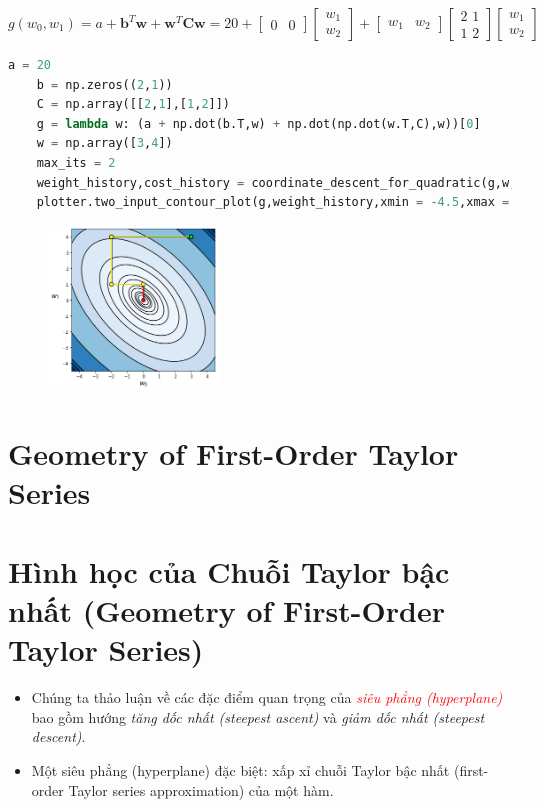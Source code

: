 \documentclass{book}
\begin{document}
\begin{equation*}
    g(w_0,w_1) = a + \mathbf{b}^{T}\mathbf{w} + \mathbf{w}^{T}\mathbf{C}\mathbf{w} = 20 + \begin{bmatrix}0 & 0\end{bmatrix}\begin{bmatrix}w_1 \\ w_2\end{bmatrix} + \begin{bmatrix}w_1 & w_2\end{bmatrix} \begin{bmatrix} 2 \,\, 1 \\ 1 \,\, 2 \end{bmatrix} \begin{bmatrix}w_1 \\ w_2\end{bmatrix}
\end{equation*}
\begin{lstlisting}[language=python]
    a = 20
    b = np.zeros((2,1))
    C = np.array([[2,1],[1,2]])
    g = lambda w: (a + np.dot(b.T,w) + np.dot(np.dot(w.T,C),w))[0]
    w = np.array([3,4])
    max_its = 2
    weight_history,cost_history = coordinate_descent_for_quadratic(g,w,max_its,a,b,C)
    plotter.two_input_contour_plot(g,weight_history,xmin = -4.5,xmax = 4.5,ymin = -4.5,ymax = 4.5,num_contours = 30,show_original = False)
\end{lstlisting}
\begin{figure}[H]
    \centering
    \includegraphics[width=0.4\textwidth]{images/convex_quadratic_functions_2.png}
\end{figure}
\section{Geometry of First-Order Taylor Series}
\section{Hình học của Chuỗi Taylor bậc nhất (Geometry of First-Order Taylor Series)}
\begin{itemize}
    \item Chúng ta thảo luận về các đặc điểm quan trọng của \textit{\textcolor{red}{siêu phẳng (hyperplane)}} bao gồm hướng \textit{tăng dốc nhất (steepest ascent)} và \textit{giảm dốc nhất (steepest descent)}.
    \item Một siêu phẳng (hyperplane) đặc biệt: xấp xỉ chuỗi Taylor bậc nhất (first-order Taylor series approximation) của một hàm.
\end{itemize}
\end{document}
